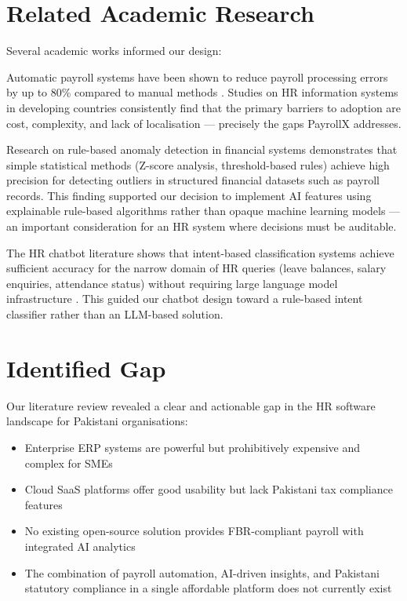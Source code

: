 \documentclass[12pt,a4paper]{report}
\begin{document}
\section{Related Academic Research}

Several academic works informed our design:

Automatic payroll systems have been shown to reduce payroll processing errors by up to 80\% compared to manual methods \cite{scribd}. Studies on HR information systems in developing countries consistently find that the primary barriers to adoption are cost, complexity, and lack of localisation --- precisely the gaps PayrollX addresses.

Research on rule-based anomaly detection in financial systems \cite{AccountingReview2021} demonstrates that simple statistical methods (Z-score analysis, threshold-based rules) achieve high precision for detecting outliers in structured financial datasets such as payroll records. This finding supported our decision to implement AI features using explainable rule-based algorithms rather than opaque machine learning models --- an important consideration for an HR system where decisions must be auditable.

The HR chatbot literature shows that intent-based classification systems achieve sufficient accuracy for the narrow domain of HR queries (leave balances, salary enquiries, attendance status) without requiring large language model infrastructure \cite{Adamopoulou2020}. This guided our chatbot design toward a rule-based intent classifier rather than an LLM-based solution.

\section{Identified Gap}

Our literature review revealed a clear and actionable gap in the HR software landscape for Pakistani organisations:

\begin{itemize}
    \item Enterprise ERP systems are powerful but prohibitively expensive and complex for SMEs
    \item Cloud SaaS platforms offer good usability but lack Pakistani tax compliance features
    \item No existing open-source solution provides FBR-compliant payroll with integrated AI analytics
    \item The combination of payroll automation, AI-driven insights, and Pakistani statutory compliance in a single affordable platform does not currently exist
\end{itemize}
\end{document}
